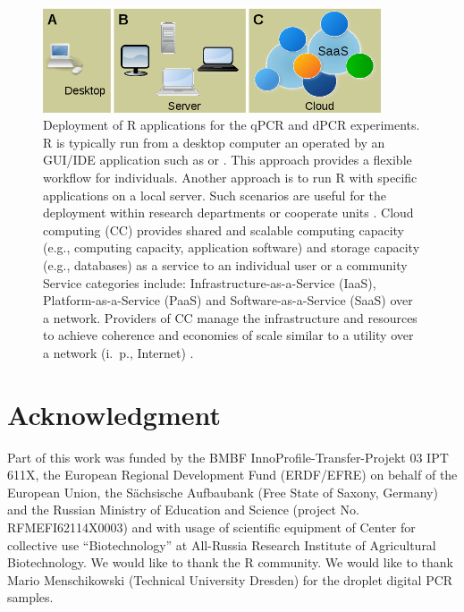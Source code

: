 \begin{figure}[htbp]
  \centering
  \includegraphics[clip=true, width=10cm]{figures/options.png}
  \caption{Deployment of R applications for the qPCR and dPCR experiments. 
 R is typically run from a desktop computer an operated by an 
GUI/IDE application such as  or . This approach 
provides a flexible workflow for individuals.  Another approach is 
to run R with specific applications on a local server. Such scenarios are 
useful 
for the deployment within research departments or cooperate units 
\citep{R_web}. 
 Cloud computing (CC) provides shared and scalable computing 
capacity (e.g., computing capacity, application software) and storage capacity 
(e.g., databases) as a service to an individual user or a community Service 
categories include: Infrastructure-as-a-Service (IaaS), Platform-as-a-Service 
(PaaS) and Software-as-a-Service (SaaS) over a network. Providers of CC manage 
the infrastructure and resources to achieve coherence and economies of scale 
similar to a utility over a network (i.~p., Internet) \citep{R_cloud}.}
  \label{figure:options}
\end{figure} 

\section{Acknowledgment}

Part of this work was funded by the BMBF InnoProfile-Transfer-Projekt 03 IPT 
611X, the European Regional Development Fund (ERDF/EFRE) on behalf of the 
European Union, the S\"{a}chsische Aufbaubank (Free State of Saxony, 
Germany) and the Russian Ministry of Education and Science (project No. 
RFMEFI62114X0003) and with usage of scientific equipment of Center for 
collective use ``Biotechnology'' at All-Russia Research Institute of 
Agricultural Biotechnology. We would like to thank the R community. We would 
like to thank Mario Menschikowski (Technical University Dresden) for the droplet 
digital PCR samples. 



